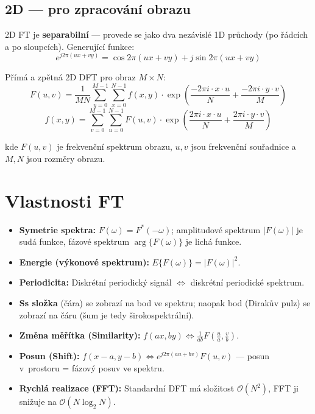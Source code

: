 \subsection*{2D — pro zpracování obrazu}
 
2D FT je \textbf{separabilní} — provede se jako dva nezávislé 1D průchody (po řádcích a po sloupcích). Generující funkce:
\[
  e^{j2\pi(ux+vy)} = \cos 2\pi(ux+vy) + j\sin 2\pi(ux+vy)
\]
 
Přímá a zpětná 2D DFT pro obraz $M \times N$:
\[
  F(u,v) = \frac{1}{MN}\sum_{y=0}^{M-1}\sum_{x=0}^{N-1} f(x,y)\cdot
    \exp\!\left(\frac{-2\pi i \cdot x \cdot u}{N} + \frac{-2\pi i \cdot y \cdot v}{M}\right)
\]
\[
  f(x,y) = \sum_{v=0}^{M-1}\sum_{u=0}^{N-1} F(u,v)\cdot
    \exp\!\left(\frac{2\pi i \cdot x \cdot u}{N} + \frac{2\pi i \cdot y \cdot v}{M}\right)
\]
 
kde $F(u,v)$ je frekvenční spektrum obrazu, $u,v$ jsou frekvenční souřadnice a $M,N$ jsou rozměry obrazu.
 
\section*{Vlastnosti FT}
 
\begin{itemize}
  \item \textbf{Symetrie spektra:} $F(\omega) = F^*(-\omega)$; amplitudové spektrum $|F(\omega)|$ je sudá funkce, fázové spektrum $\arg\{F(\omega)\}$ je lichá funkce.
  \item \textbf{Energie (výkonové spektrum):} $E\{F(\omega)\} = |F(\omega)|^2$.
  \item \textbf{Periodicita:} Diskrétní periodický signál $\Leftrightarrow$ diskrétní periodické spektrum.
  \item \textbf{Ss složka} (čára) se zobrazí na bod ve spektru; naopak bod (Dirakův pulz) se zobrazí na čáru (šum je tedy širokospektrální).
  \item \textbf{Změna měřítka (Similarity):} $f(ax, by) \Leftrightarrow \frac{1}{ab}F\!\left(\frac{u}{a}, \frac{v}{b}\right)$.
  \item \textbf{Posun (Shift):} $f(x-a, y-b) \Leftrightarrow e^{j2\pi(au+bv)}F(u,v)$ — posun v~prostoru = fázový posuv ve spektru.
  \item \textbf{Rychlá realizace (FFT):} Standardní DFT má složitost $\mathcal{O}(N^2)$, FFT ji snižuje na $\mathcal{O}(N \log_2 N)$.
\end{itemize}
 
